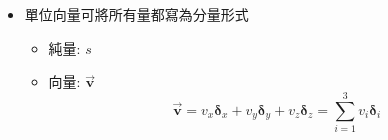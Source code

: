 \documentclass[../main.tex]{subfiles}
\begin{document}
\begin{itemize}
\begin{itemize}
\begin{enumerate}
            當$i=m$且$j=n$時，但$i\neq j$，只有一項\\
            第三個標不是$i$也不是$j$的會有值，且為$1^2=1$，其他兩項皆為0\\
            而此時$ \delta_{im}\delta_{jn} - \delta_{in}\delta_{jm} = \delta_{mm}\delta_{nn} - \delta_{mn}\delta_{nm} = 1$\\
            當$i=m$且$j=n$且$i=j$時，每一項因為前兩個標必相同，皆為0\\
            而此時$ \delta_{im}\delta_{jn} - \delta_{in}\delta_{jm} = \delta_{mm}\delta_{mm} - \delta_{mm}\delta_{mm} = 1-1 = 0$\\
            當$i=n$且$j=m$時，但$i\neq j$，只有一項，第三個標不是$i$也不是$j$的會有值\\
            且因為前兩個標相反，故$\varepsilon_{nm1}\varepsilon_{mn1}=-1$\\
            而此時$ \delta_{im}\delta_{jn} - \delta_{in}\delta_{jm} = \delta_{nm}\delta_{mn} - \delta_{nn}\delta_{mm} = -1$\\
            故總結可得:
            \begin{equation}
              \sum_{k=1}^3 \varepsilon_{ijk}\varepsilon_{mnk} = \delta_{im}\delta_{jn} - \delta_{in}\delta_{jm}
            \end{equation}
        \end{enumerate}
      \item $\varepsilon_{ijk}$可以表示行列式的值
      \begin{equation}
        \begin{vmatrix}
          a_1 & a_2 & a_3 \\
          b_1 & b_2 & b_3 \\
          c_1 & c_2 & c_3
        \end{vmatrix} = \sum_{i=1}^3\sum_{j=1}^3\sum_{k=1}^3 \varepsilon_{ijk} a_i b_j c_k
      \end{equation}
      就是把27種排列組合中，循環排列的加起來，反循環排列的減掉
  \end{itemize}
  \item 單位向量可將所有量都寫為分量形式
    \begin{itemize}
      \item 純量: $s$
      \item 向量: $\vec {\bm v}$
        \begin{equation}
          \vec {\bm v} = v_x \bm \delta_x + v_y \bm \delta_y + v_z \bm \delta_z =  \sum_{i=1}^3 v_i \bm \delta_i
        \end{equation}

\end{itemize}
\end{itemize}
\end{document}
